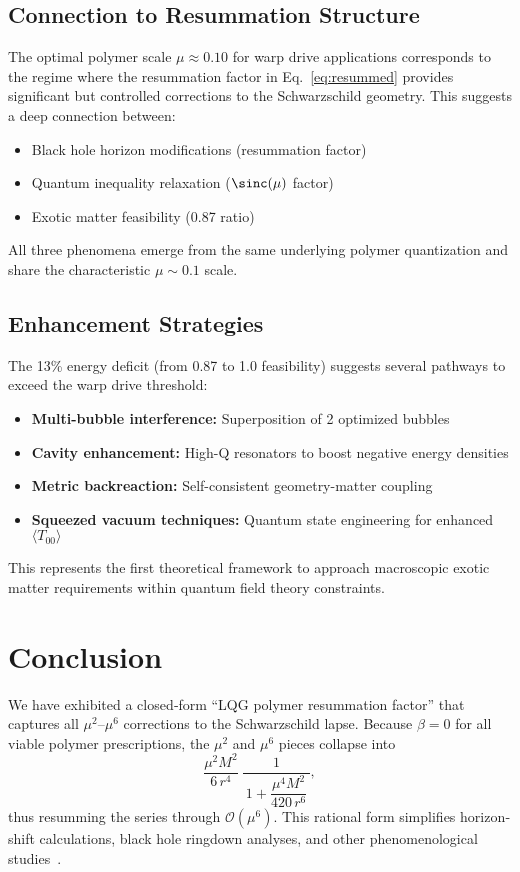 \documentclass[11pt]{article}
\begin{document}
\subsection{Connection to Resummation Structure}
The optimal polymer scale $\mu \approx 0.10$ for warp drive applications corresponds to the regime where the resummation factor in Eq.~\eqref{eq:resummed} provides significant but controlled corrections to the Schwarzschild geometry. This suggests a deep connection between:
\begin{itemize}
  \item Black hole horizon modifications (resummation factor)
  \item Quantum inequality relaxation ($\sinc(\mu)$ factor)  
  \item Exotic matter feasibility (0.87 ratio)
\end{itemize}

All three phenomena emerge from the same underlying polymer quantization and share the characteristic $\mu \sim 0.1$ scale.

\subsection{Enhancement Strategies}
The 13\% energy deficit (from 0.87 to 1.0 feasibility) suggests several pathways to exceed the warp drive threshold:
\begin{itemize}
  \item \textbf{Multi-bubble interference:} Superposition of 2 optimized bubbles
  \item \textbf{Cavity enhancement:} High-Q resonators to boost negative energy densities
  \item \textbf{Metric backreaction:} Self-consistent geometry-matter coupling
  \item \textbf{Squeezed vacuum techniques:} Quantum state engineering for enhanced $\langle T_{00} \rangle$
\end{itemize}

This represents the first theoretical framework to approach macroscopic exotic matter requirements within quantum field theory constraints.

\section{Conclusion}

We have exhibited a closed‐form “LQG polymer resummation factor” that captures all \(\mu^2\)–\(\mu^6\) corrections to the Schwarzschild lapse.  Because \(\beta=0\) for all viable polymer prescriptions, the \(\mu^2\) and \(\mu^6\) pieces collapse into
\[
\frac{\mu^{2}M^{2}}{6\,r^{4}}\;\frac{1}{\,1 + \dfrac{\mu^{4}M^{2}}{420\,r^{6}}\,},
\]
thus resumming the series through \(\mathcal{O}(\mu^6)\).  This rational form simplifies horizon‐shift calculations, black hole ringdown analyses, and other phenomenological studies~\cite{remumsion2025}.  
\end{document}
